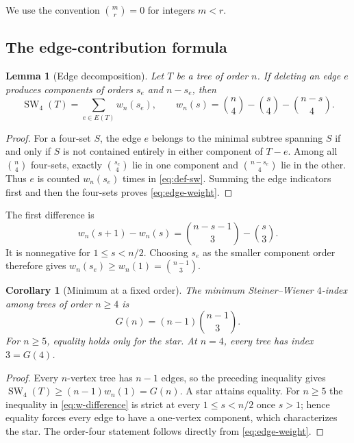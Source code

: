 \documentclass[11pt]{article}
\newtheorem{lemma}[theorem]{Lemma}
\newtheorem{corollary}[theorem]{Corollary}
\theoremstyle{definition}
\theoremstyle{remark}
\newcommand{\SW}{\operatorname{SW}_4}
\newcommand{\C}[2]{\binom{#1}{#2}}
\begin{document}
We use the convention $\binom{m}{r}=0$ for integers $m<r$.

\subsection{The edge-contribution formula}

\begin{lemma}[Edge decomposition]\label{lem:edge}
Let $T$ be a tree of order $n$.  If deleting an edge $e$ produces components
of orders $s_e$ and $n-s_e$, then
\begin{equation}\label{eq:edge-weight}
  \SW(T)=\sum_{e\in E(T)}w_n(s_e),
  \qquad
  w_n(s)=\C{n}{4}-\C{s}{4}-\C{n-s}{4}.
\end{equation}
\end{lemma}

\begin{proof}
For a four-set $S$, the edge $e$ belongs to the minimal subtree spanning $S$
if and only if $S$ is not contained entirely in either component of $T-e$.
Among all $\binom n4$ four-sets, exactly $\binom{s_e}{4}$ lie in one
component and $\binom{n-s_e}{4}$ lie in the other.  Thus $e$ is counted
$w_n(s_e)$ times in \eqref{eq:def-sw}.  Summing the edge indicators first and
then the four-sets proves \eqref{eq:edge-weight}.
\end{proof}

The first difference is
\begin{equation}\label{eq:w-difference}
  w_n(s+1)-w_n(s)
  =\C{n-s-1}{3}-\C{s}{3}.
\end{equation}
It is nonnegative for $1\le s<n/2$.  Choosing $s_e$ as the smaller component
order therefore gives $w_n(s_e)\ge w_n(1)=\binom{n-1}{3}$.

\begin{corollary}[Minimum at a fixed order]\label{cor:star-min}
The minimum Steiner--Wiener $4$-index among trees of order $n\ge4$ is
\begin{equation}\label{eq:G}
  G(n)=(n-1)\C{n-1}{3}.
\end{equation}
For $n\ge5$, equality holds only for the star.  At $n=4$, every tree has
index $3=G(4)$.
\end{corollary}

\begin{proof}
Every $n$-vertex tree has $n-1$ edges, so the preceding inequality gives
$\SW(T)\ge(n-1)w_n(1)=G(n)$.  A star attains equality.  For $n\ge5$ the
inequality in \eqref{eq:w-difference} is strict at every $1\le s<n/2$ once
$s>1$; hence equality forces every edge to have a one-vertex component, which
characterizes the star.  The order-four statement follows directly from
\eqref{eq:edge-weight}.
\end{proof}
\end{document}
